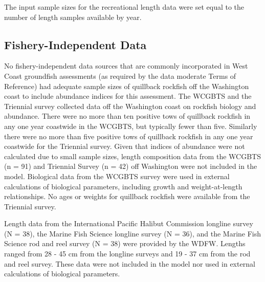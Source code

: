 \documentclass[11pt,
  english,
  letterpaper,
]{article}
\begin{document}
\leavevmode\tagmcend\tagstructend\par


The input sample sizes for the recreational length data were set equal to the number of length samples available by year.

\leavevmode\tagmcend\tagstructend\par


\hypertarget{fishery-independent-data}{%
\subsection{Fishery-Independent Data}\label{fishery-independent-data}}

\leavevmode\tagmcend\tagstructend


No fishery-independent data sources that are commonly incorporated in West Coast groundfish assessments (as required by the data moderate Terms of Reference) had adequate sample sizes of quillback rockfish off the Washington coast to include abundance indices for this assessment. The WCGBTS and the Triennial survey collected data off the Washington coast on rockfish biology and abundance. There were no more than ten positive tows of quillback rockfish in any one year coastwide in the WCGBTS, but typically fewer than five. Similarly there were no more than five positive tows of quillback rockfish in any one year coastwide for the Triennial survey. Given that indices of abundance were not calculated due to small sample sizes, length composition data from the WCGBTS (n = 91) and Triennial Survey (n = 42) off Washington were not included in the model. Biological data from the WCGBTS survey were used in external calculations of biological parameters, including growth and weight-at-length relationships. No ages or weights for quillback rockfish were available from the Triennial survey.

\leavevmode\tagmcend\tagstructend\par


Length data from the International Pacific Halibut Commission longline survey (N = 38), the Marine Fish Science longline survey (N = 36), and the Marine Fish Science rod and reel survey (N = 38) were provided by the WDFW. Lengths ranged from 28 - 45 cm from the longline surveys and 19 - 37 cm from the rod and reel survey. These data were not included in the model nor used in external calculations of biological parameters.
\end{document}
